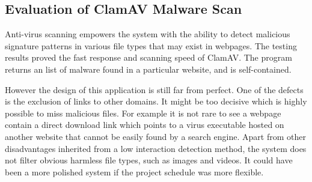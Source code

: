 \subsection{Evaluation of ClamAV Malware Scan}
Anti-virus scanning empowers the system with the ability to detect malicious 
signature patterns in various file types that may exist in webpages. The 
testing results proved the fast response and scanning speed of ClamAV. The 
program returns an list of malware found in a particular website, and 
is self-contained.

However the design of this application is still far from perfect. One of the 
defects is the exclusion of links to other domains. It might be too 
decisive which is highly possible to miss malicious files. For example it is 
not rare to see a webpage contain a direct download link which points to a 
virus executable hosted on another website that cannot be easily found by 
a search engine. Apart from other disadvantages inherited from a low interaction 
detection method, the system does not filter obvious 
harmless file types, such as images and videos. It could have been a more polished system if 
the project schedule was more flexible.

